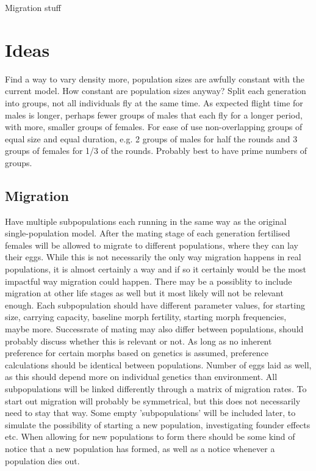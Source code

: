 \documentclass{article}
\begin{document}
Migration stuff

\section{Ideas}
Find a way to vary density more, population sizes are awfully constant with the current model. How constant are population sizes anyway?
Split each generation into groups, not all individuals fly at the same time. As expected flight time for males is longer, perhaps fewer groups of males that each fly for a longer period, with more, smaller groups of females. For ease of use non-overlapping groups of equal size and equal duration, e.g. 2 groups of males for half the rounds and 3 groups of females for 1/3 of the rounds. Probably best to have prime numbers of groups.

\subsection{Migration}
Have multiple subpopulations each running in the same way as the original single-population model.
After the mating stage of each generation fertilised females will be allowed to migrate to different populations, where they can lay their eggs. While this is not necessarily the only way migration happens in real populations, it is almost certainly a way and if so it certainly would be the most impactful way migration could happen. There may be a possiblity to include migration at other life stages as well but it most likely will not be relevant enough.
Each subpopulation should have different parameter values, for starting size, carrying capacity, baseline morph fertility, starting morph frequencies, maybe more.
Successrate of mating may also differ between populations, should probably discuss whether this is relevant or not.
As long as no inherent preference for certain morphs based on genetics is assumed, preference calculations should be identical between populations. Number of eggs laid as well, as this should depend more on individual genetics than environment.
All subpopulations will be linked differently through a matrix of migration rates. To start out migration will probably be symmetrical, but this does not necessarily need to stay that way.
Some empty 'subpopulations' will be included later, to simulate the possibility of starting a new population, investigating founder effects etc.
When allowing for new populations to form there should be some kind of notice that a new population has formed, as well as a notice whenever a population dies out. 
\end{document}
